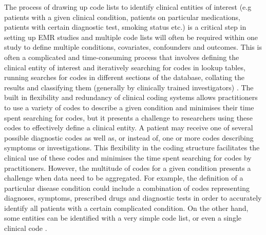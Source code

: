 \documentclass[10pt]{article}
\begin{document}
The process of drawing up code lists to identify clinical entities of interest (e.g patients with a given clinical condition, patients on particular medications, patients with certain diagnostic test, smoking status etc.) is a critical step in setting up EMR studies and multiple code lists will often be required within one study to define multiple conditions, covariates, confounders and outcomes.  This is often a complicated and time-consuming process that involves defining the clinical entity of interest and iteratively searching for codes in lookup tables, running searches for codes in different sections of the database, collating the results and classifying them (generally by clinically trained investigators) \cite{Dave2009, Nicholson2013}.  The built in flexibility and redundancy of clinical coding systems allows practitioners to use a variety of codes to describe a given condition and minimises their time spent searching for codes, but it presents a challenge to researchers using these codes to effectively define a clinical entity. A patient may receive one of several possible diagnostic codes as well as, or instead of, one or more codes describing symptoms or investigations. This flexibility in the coding structure facilitates the clinical use of these codes and minimises the time spent searching for codes by practitioners. However, the multitude of codes for a given condition presents a challenge when data need to be aggregated. For example, the definition of a particular disease condition could include a combination of codes representing diagnoses, symptoms, prescribed drugs and diagnostic tests in order to accurately identify all patients with a certain complicated condition.  On the other hand, some entities can be identified with a very simple code list, or even a single clinical code \cite{Kotz2011}.
\end{document}

